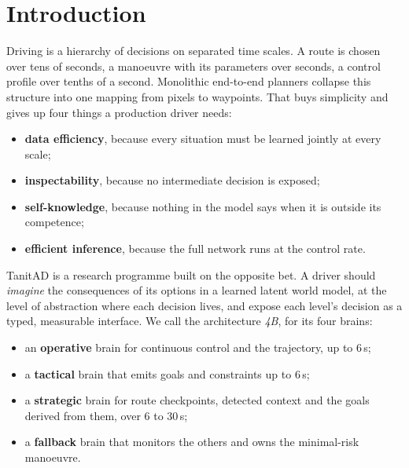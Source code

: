 \documentclass[10pt,twocolumn]{article}
\theoremstyle{remark}
\begin{document}
\begin{abstract}
pilot of a finer token grid (card ADD41); the pod sat without a job for about 65 hours because a launcher did not start. All of it rests on an evaluation
doctrine built for decisions rather than leaderboards: pre-registered bars with both outcomes committed, episode-cluster bootstrap
intervals, explicit seed variance and four metric families on every evaluation. We close with the remaining frontier (assertive
launch from standstill), the re-rendered simulation tier built to address it, and a research roadmap toward a 4B driver within a
budget of at most 800\,M parameters, deployable within 100\,ms on an edge computer.
\end{abstract}

\section{Introduction}
Driving is a hierarchy of decisions on separated time scales. A route is chosen over tens of seconds, a manoeuvre with its
parameters over seconds, a control profile over tenths of a second. Monolithic end-to-end planners collapse this structure into one
mapping from pixels to waypoints. That buys simplicity and gives up four things a production driver needs:
\begin{itemize}
  \item \textbf{data efficiency}, because every situation must be learned jointly at every scale;
  \item \textbf{inspectability}, because no intermediate decision is exposed;
  \item \textbf{self-knowledge}, because nothing in the model says when it is outside its competence;
  \item \textbf{efficient inference}, because the full network runs at the control rate.
\end{itemize}

TanitAD is a research programme built on the opposite bet. A driver should \emph{imagine} the consequences of its options in a
learned latent world model, at the level of abstraction where each decision lives, and expose each level's decision as a typed,
measurable interface. We call the architecture \emph{4B}, for its four brains:
\begin{itemize}
  \item an \textbf{operative} brain for continuous control and the trajectory, up to 6\,s;
  \item a \textbf{tactical} brain that emits goals and constraints up to 6\,s;
  \item a \textbf{strategic} brain for route checkpoints, detected context and the goals derived from them, over 6 to 30\,s;
  \item a \textbf{fallback} brain that monitors the others and owns the minimal-risk manoeuvre.
\end{itemize}
\end{document}

